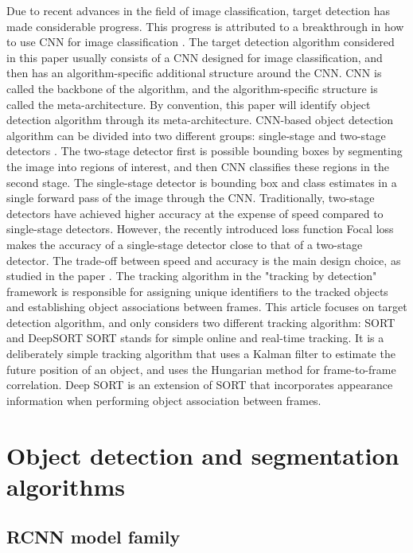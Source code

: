 Due to recent advances in the field of image classification, target detection has made considerable progress. This progress is attributed to a breakthrough in how to use CNN for image classification \cite{10.1145/3065386}. The target detection algorithm considered in this paper usually consists of a CNN designed for image classification, and then has an algorithm-specific additional structure around the CNN. CNN is called the backbone of the algorithm, and the algorithm-specific structure is called the meta-architecture. By convention, this paper will identify object detection algorithm through its meta-architecture. CNN-based object detection algorithm can be divided into two different groups: single-stage and two-stage detectors \cite{DBLP:journals/corr/abs-1808-07256}. The two-stage detector first is possible bounding boxes by segmenting the image into regions of interest, and then CNN classifies these regions in the second stage. The single-stage detector is bounding box and class estimates in a single forward pass of the image through the CNN. Traditionally, two-stage detectors have achieved higher accuracy at the expense of speed compared to single-stage detectors. However, the recently introduced loss function Focal loss \cite{DBLP:journals/corr/abs-1708-02002} makes the accuracy of a single-stage detector close to that of a two-stage detector. The trade-off between speed and accuracy is the main design choice, as studied in the paper \cite{DBLP:journals/corr/HuangRSZKFFWSG016}.
The tracking algorithm in the "tracking by detection" framework is responsible for assigning unique identifiers to the tracked objects and establishing object associations between frames. This article focuses on target detection algorithm, and only considers two different tracking algorithm: SORT and DeepSORT SORT stands for simple online and real-time tracking. It is a deliberately simple tracking algorithm that uses a Kalman filter \cite{10.1115/1.3662552} to estimate the future position of an object, and uses the Hungarian method \cite{doi:10.1002/nav.3800020109} for frame-to-frame correlation. Deep SORT is an extension of SORT that incorporates appearance information when performing object association between frames.
\section{Object detection and segmentation algorithms}
\subsection{RCNN model family}
